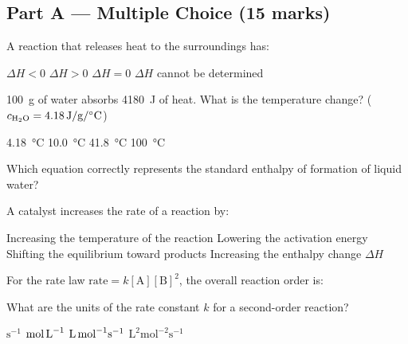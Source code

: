 \documentclass[addpoints]{exam}
\begin{document}
\newpage
\begin{questions}

\section*{Part A --- Multiple Choice (15 marks)}
\vspace{5mm}

\question[1] A reaction that releases heat to the surroundings has:
\begin{choices}
    \correctchoice $\Delta H < 0$
    \choice $\Delta H > 0$
    \choice $\Delta H = 0$
    \choice $\Delta H$ cannot be determined
\end{choices}

\question[1] \SI{100}{g} of water absorbs \SI{4180}{J} of heat. What is the temperature change?
($c_{\ce{H2O}} = \SI{4.18}{J\per g\per\celsius}$)
\begin{choices}
    \choice \SI{4.18}{\celsius}
    \correctchoice \SI{10.0}{\celsius}
    \choice \SI{41.8}{\celsius}
    \choice \SI{100}{\celsius}
\end{choices}

\question[1] Which equation correctly represents the standard enthalpy of formation of
liquid water?
\begin{choices}
    \choice {}
    \correctchoice {}
    \choice {}
    \choice {}
\end{choices}

\question[1] A catalyst increases the rate of a reaction by:
\begin{choices}
    \choice Increasing the temperature of the reaction
    \correctchoice Lowering the activation energy
    \choice Shifting the equilibrium toward products
    \choice Increasing the enthalpy change $\Delta H$
\end{choices}

\question[1] For the rate law $\text{rate} = k[\text{A}][\text{B}]^2$, the overall reaction
order is:
\begin{choices}
\end{choices}

\question[1] What are the units of the rate constant $k$ for a second-order reaction?
\begin{choices}
    \choice $\text{s}^{-1}$
    \choice $\text{mol\,L}^{-1}$
    \correctchoice $\text{L\,mol}^{-1}\text{s}^{-1}$
    \choice $\text{L}^2\text{mol}^{-2}\text{s}^{-1}$
\end{choices}


\end{questions}
\end{document}
